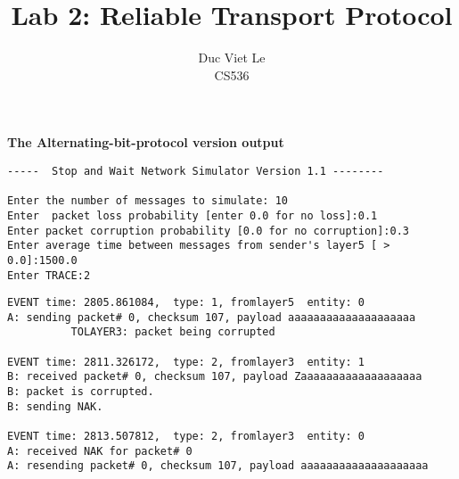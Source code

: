 \documentclass[12pt]{article}
\begin{document}
 
\title{Lab 2: Reliable Transport Protocol}
\author{Duc Viet Le\\ 
CS536}
 
\maketitle
\noindent
\large{\textbf{The Alternating-bit-protocol version output}}
\normalsize

\begin{Verbatim}[frame=single, rulecolor=\color{green}, label=Input] 
-----  Stop and Wait Network Simulator Version 1.1 -------- 

Enter the number of messages to simulate: 10
Enter  packet loss probability [enter 0.0 for no loss]:0.1
Enter packet corruption probability [0.0 for no corruption]:0.3
Enter average time between messages from sender's layer5 [ > 0.0]:1500.0
Enter TRACE:2
\end{Verbatim}
\begin{Verbatim}[frame=single, rulecolor=\color{red}, label=Handle Corruption] 
EVENT time: 2805.861084,  type: 1, fromlayer5  entity: 0
A: sending packet# 0, checksum 107, payload aaaaaaaaaaaaaaaaaaaa
          TOLAYER3: packet being corrupted

EVENT time: 2811.326172,  type: 2, fromlayer3  entity: 1
B: received packet# 0, checksum 107, payload Zaaaaaaaaaaaaaaaaaaa
B: packet is corrupted.
B: sending NAK.

EVENT time: 2813.507812,  type: 2, fromlayer3  entity: 0
A: received NAK for packet# 0
A: resending packet# 0, checksum 107, payload aaaaaaaaaaaaaaaaaaaa
\end{Verbatim}
\end{document}
